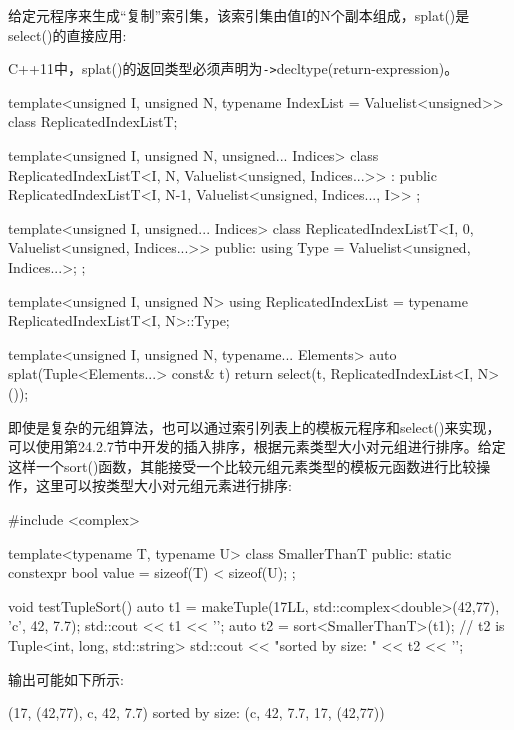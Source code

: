 给定元程序来生成“复制”索引集，该索引集由值I的N个副本组成，splat()是select()的直接应用:

\begin{notice}
C++11中，splat()的返回类型必须声明为\texttt{->}decltype(return-expression)。
\end{notice}

\begin{cpp}
template<unsigned I, unsigned N, typename IndexList = Valuelist<unsigned>>
class ReplicatedIndexListT;

template<unsigned I, unsigned N, unsigned... Indices>
class ReplicatedIndexListT<I, N, Valuelist<unsigned, Indices...>>
: public ReplicatedIndexListT<I, N-1,
								Valuelist<unsigned, Indices..., I>> {
};

template<unsigned I, unsigned... Indices>
class ReplicatedIndexListT<I, 0, Valuelist<unsigned, Indices...>> {
	public:
	using Type = Valuelist<unsigned, Indices...>;
};

template<unsigned I, unsigned N>
using ReplicatedIndexList = typename ReplicatedIndexListT<I, N>::Type;

template<unsigned I, unsigned N, typename... Elements>
auto splat(Tuple<Elements...> const& t)
{
	return select(t, ReplicatedIndexList<I, N>());
}
\end{cpp}

即使是复杂的元组算法，也可以通过索引列表上的模板元程序和select()来实现，可以使用第24.2.7节中开发的插入排序，根据元素类型大小对元组进行排序。给定这样一个sort()函数，其能接受一个比较元组元素类型的模板元函数进行比较操作，这里可以按类型大小对元组元素进行排序:

\begin{cpp}
#include <complex>

template<typename T, typename U>
class SmallerThanT
{
	public:
	static constexpr bool value = sizeof(T) < sizeof(U);
};

void testTupleSort()
{
	auto t1 = makeTuple(17LL, std::complex<double>(42,77), 'c', 42, 7.7);
	std::cout << t1 << '\n';
	auto t2 = sort<SmallerThanT>(t1); // t2 is Tuple<int, long, std::string>
	std::cout << "sorted by size: " << t2 << '\n';
}
\end{cpp}

输出可能如下所示:

\begin{cpp}
(17, (42,77), c, 42, 7.7)
sorted by size: (c, 42, 7.7, 17, (42,77))
\end{cpp}

